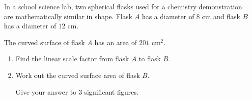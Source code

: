 \begin{question}
\noindent In a school science lab, two spherical flasks used for a chemistry demonstration are mathematically similar in shape. Flask $A$ has a diameter of $8$ cm and flask $B$ has a diameter of $12$ cm.

\begin{center}
\end{center}

\noindent The curved surface of flask $A$ has an area of $201$ cm$^2$.

\begin{enumerate}
    \item[(a)] Find the linear scale factor from flask $A$ to flask $B$.
    \vspace{2.5cm}

    \item[(b)] Work out the curved surface area of flask $B$.

    Give your answer to 3 significant figures.
    \vspace{5cm}
\end{enumerate}
\end{question}
